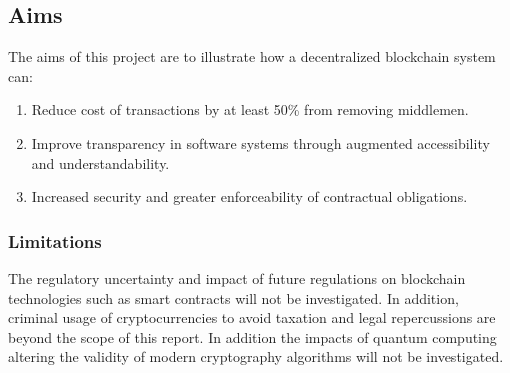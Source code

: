 \subsection{Aims}
The aims of this project are to illustrate how a decentralized blockchain system can:
\begin{enumerate}
\item Reduce cost of transactions by at least 50\% from removing middlemen.
\item Improve transparency in software systems through augmented accessibility and understandability.
\item Increased security and greater enforceability of contractual obligations.
\end{enumerate}
\subsubsection{Limitations}

The regulatory uncertainty and impact of future regulations on blockchain technologies such as smart contracts will not be investigated. In addition, criminal usage of cryptocurrencies to avoid taxation and legal repercussions are beyond the scope of this report. In addition the impacts of quantum computing altering the validity of modern cryptography algorithms will not be investigated.

\newpage  
